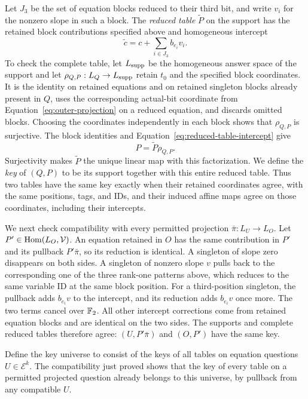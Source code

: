 Let \(J_3\) be the set of equation blocks reduced to their third bit,
and write \(v_i\) for the nonzero slope in such a block.  The
\emph{reduced table} \(\widetilde P\) on the support has the retained
block contributions specified above and homogeneous intercept
\begin{equation}
 \widetilde c=c+\sum_{i\in J_3} b_{e_i}v_i.
 \label{eq:reduced-table-intercept}
\end{equation}
To check the complete table, let \(L_{\rm supp}\) be the homogeneous
answer space of the support and let
\(\rho_{Q,P}:L_Q\to L_{\rm supp}\) retain \(t_0\) and the
specified block coordinates.  It is the identity on retained equations
and on retained singleton blocks already present in \(Q\), uses the
corresponding actual-bit coordinate from
Equation~\eqref{eq:outer-projection} on a reduced equation, and discards
omitted blocks.  Choosing the coordinates independently in each
block shows that \(\rho_{Q,P}\) is surjective.  The block identities
and Equation~\eqref{eq:reduced-table-intercept} give
\[
 P=\widetilde P\rho_{Q,P}.
\]
Surjectivity makes \(\widetilde P\) the unique linear map with this
factorization.  We define the \emph{key} of \((Q,P)\) to be its
support together with this entire reduced table.  Thus two tables have
the same key exactly when their retained coordinates agree, with the same
positions, tags, and IDs, and their induced affine maps agree on those
coordinates, including their intercepts.

We next check compatibility with every permitted projection
\(\bar\pi:L_U\to L_O\).  Let
\(P'\in\operatorname{Hom}(L_O,\mathcal V)\).  An equation retained in \(O\)
has the same contribution in \(P'\) and its pullback \(P'\bar\pi\),
so its reduction is identical.  A singleton of slope zero disappears on
both sides.  A singleton of nonzero slope \(v\) pulls back to the
corresponding one of the three rank-one patterns above, which reduces to
the same variable ID at the same block position.  For a third-position
singleton, the pullback adds \(b_{e_i}v\) to the intercept, and its
reduction adds \(b_{e_i}v\) once more.  The two terms cancel over
\(\mathbb F_2\).  All other intercept corrections come from retained equation
blocks and are identical on the two sides.  The supports and complete
reduced tables therefore agree: \((U,P'\bar\pi)\) and \((O,P')\)
have the same key.

Define the key universe to consist of the keys of all tables on equation
questions \(U\in\mathcal E^k\).  The compatibility just proved shows
that the key of every table on a permitted projected question already
belongs to this universe, by pullback from any compatible \(U\).

